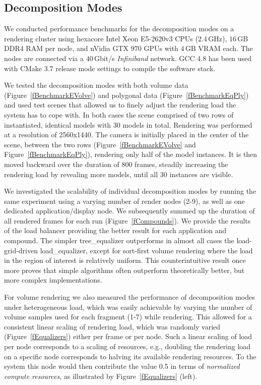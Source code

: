 \documentclass[10pt,journal,compsoc]{IEEEtran}
\newcommand{\fig}[1]{Figure~\ref{#1}}
\begin{document}
\subsection{Decomposition Modes}


We conducted performance benchmarks for the decomposition modes on a
rendering cluster using hexacore Intel Xeon E5-2620v3 CPUs ($2.4$\,GHz), $16$\,GB DDR4 RAM per node, and nVidia GTX $970$ GPUs with $4$\,GB VRAM each. The nodes are connected via a $40$\,Gbit/s {\em Infiniband} network.
GCC 4.8 has been used with CMake 3.7 release mode settings to compile the software stack.

We tested the decomposition modes with both volume data (\fig{fBenchmarkEVolve})
and polygonal data  (\fig{fBenchmarkEqPly}) and used test scenes that allowed us
to finely adjust the rendering load the system has to cope with. In both cases
the scene comprised of two rows of instantiated, identical models with 30 models
in total. Rendering was performed at a resolution of 2560x1440. The camera is
initially placed in the center of the scene, between the two rows
(\fig{fBenchmarkEVolve} and \fig{fBenchmarkEqPly}), rendering only half of the
model instances. It is then moved backward over the duration of 800 frames,
steadily increasing the rendering load by revealing more models, until all 30
instances are visible.

We investigated the scalability of individual decomposition modes by running the
same experiment using a varying number of render nodes (2-9), as well as one
dedicated application/display node. We subsequently summed up the duration of
all rendered frames for each run (\fig{fCompounds}). We provide the results of
the load balancer providing the better result for each application and compound.
The simpler \textsf{tree\_equalizer} outperforms in almost all cases the
load-grid-driven \textsf{load\_equalizer}, except for sort-first volume
rendering where the load in the region of interest is relatively uniform. This
counterintuitive result once more proves that simple algorithms often outperform
theoretically better, but more complex implementations.

For volume rendering we also measured the performance of decomposition modes
under heterogeneous load, which was easily achievable by varying the number of
volume samples used for each fragment (1-7) while rendering. This allowed for a
consistent linear scaling of rendering load, which was randomly varied
(\fig{fEqualizers}) either per frame or per node. Such a linear scaling of load
per node corresponds to a scaling of resources, e.g., doubling the rendering
load on a specific node corresponds to halving its available rendering
resources. To the system this node would then contribute the value 0.5 in terms
of {\em normalized compute resources}, as illustrated by \fig{fEqualizers}
(left).
\end{document}
